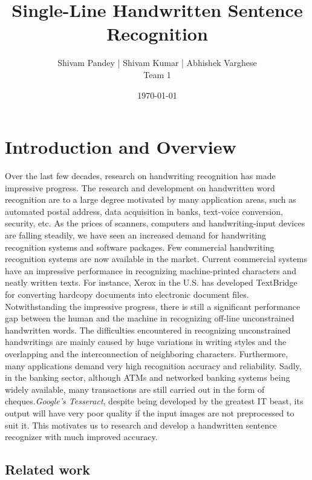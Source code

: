 \documentclass[a4paper, 10pt,twocolumn]{article}
\begin{document}
	
\title{Single-Line Handwritten Sentence Recognition}
\author{Shivam Pandey | Shivam Kumar | Abhishek Varghese\\Team 1} 
\date{\today}

\maketitle


 
\section{Introduction and Overview}
Over the last few decades, research on handwriting recognition has made impressive progress. The research and development on handwritten word recognition are to a large degree motivated by many application areas, such as automated postal address, data acquisition in banks, text-voice conversion, security, etc. As the prices of scanners, computers and handwriting-input devices are falling steadily, we have seen an increased demand for handwriting recognition systems and software packages. Few commercial handwriting recognition systems are now available in the market. Current commercial systems have an impressive performance in recognizing machine-printed characters and neatly written texts. For instance, Xerox in the U.S. has developed TextBridge for converting hardcopy documents into electronic document files. Notwithstanding the impressive progress, there is still a significant performance gap between the human and the machine in recognizing off-line unconstrained handwritten words. The difficulties encountered in recognizing unconstrained handwritings are mainly caused by huge variations in writing styles and the overlapping and the interconnection of neighboring characters. Furthermore, many applications demand very high recognition accuracy and reliability. Sadly, in the banking sector, although ATMs and networked banking systems being widely available, many transactions are still carried out in the form of cheques.\emph{Google's Tesseract}, despite being developed by the greatest IT beast, its output will have very poor quality if the input images are not preprocessed to suit it. This motivates us to research and develop a handwritten sentence recognizer with much improved accuracy.
\subsection*{Related work}
\end{document}
